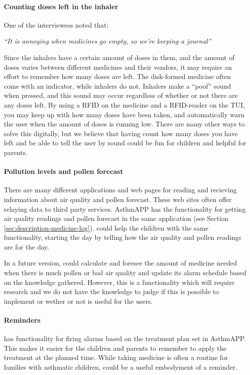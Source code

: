 \paragraph{Counting doses left in the inhaler}
One of the interviewees noted that: 

\textit{``It is annoying when medicines go empty, so we're keeping a journal''}

Since the inhalers have a certain amount of doses in them, and the amount of doses varies between different medicines and their vendors, it may require an effort to remember how many doses are left. The disk-formed medicine often come with an indicator, while inhalers do not. Inhalers make a ``poof'' sound when pressed, and this sound may occur regardless of whether or not there are any doses left. By using a RFID on the medicine and a RFID-reader on the TUI, you may keep up with how many doses have been taken, and automatically warn the user when the amount of doses is running low. There are many other ways to solve this digitally, but we believe that having \buddy{} count how many doses you have left and be able to tell the user by sound could be fun for children and helpful for parents.

\paragraph{Pollution levels and pollen forecast}
There are many different applications and web pages for reading and recieving information about air quality and pollen forecast. These web sites often offer relaying data to third party services. AsthmAPP has the functionality for getting air quality readings and pollen forecast in the same application (see Section \ref{sec:description-medicine-log}).
\buddy{} could help the children with the same functionality, starting the day by telling how the air quality and pollen readings are for the day. 

In a future version, \buddy{} could calculate and foresee the amount of medicine needed when there is much pollen or bad air quality and update its alarm schedule based on the knowledge gathered. However, this is a functionality which will require research and we do not have the knowledge to judge if this is possible to implement or wether or not is useful for the users. 


\paragraph{Reminders}
\buddy{} has functionality for firing alarms based on the treatment plan set in AsthmAPP. This makes it easier for the children and parents to remember to apply the treatment at the planned time. While taking medicine is often a routine for families with asthmatic children, \buddy{} could be a useful embodyment of a reminder. 

